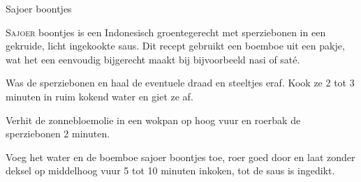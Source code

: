 \begin{recipe}{Sajoer boontjes}


\lettrine{S}{ajoer} boontjes is een Indonesisch groentegerecht met sperziebonen
in een gekruide, licht ingekookte saus. Dit recept gebruikt een boemboe uit
een pakje, wat het een eenvoudig bijgerecht maakt bij bijvoorbeeld nasi of
saté.

\begin{ingredients}
\end{ingredients}

\begin{steps}
  \item Was de sperziebonen en haal de eventuele draad en steeltjes eraf.
        Kook ze 2 tot 3 minuten in ruim kokend water en giet ze af.
  \item Verhit de zonnebloemolie in een wokpan op hoog vuur en roerbak de
        sperziebonen 2 minuten.
  \item Voeg het water en de boemboe sajoer boontjes toe, roer goed door en
        laat zonder deksel op middelhoog vuur 5 tot 10 minuten inkoken, tot
        de saus is ingedikt.
\end{steps}

\end{recipe}

